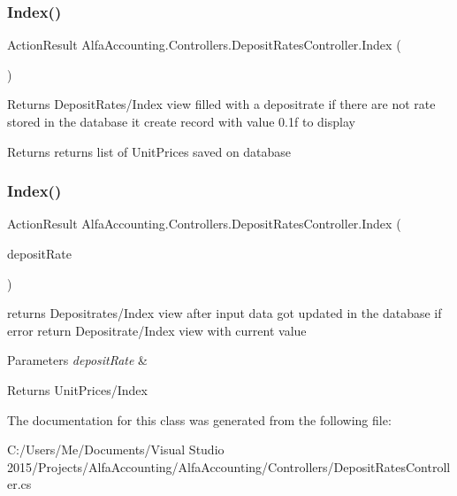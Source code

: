 \subsubsection{\texorpdfstring{Index()}{Index()}\hspace{0.1cm}{\footnotesize\ttfamily [1/2]}}
{\footnotesize\ttfamily Action\+Result Alfa\+Accounting.\+Controllers.\+Deposit\+Rates\+Controller.\+Index (\begin{DoxyParamCaption}{ }\end{DoxyParamCaption})}



Returns Deposit\+Rates/\+Index view filled with a depositrate if there are not rate stored in the database it create record with value 0.\+1f to display 

\begin{DoxyReturn}{Returns}
returns list of Unit\+Prices saved on database 
\end{DoxyReturn}
\mbox{\label{class_alfa_accounting_1_1_controllers_1_1_deposit_rates_controller_a3aa92fede4c4258ab97202ac2788b0d9}} 
\subsubsection{\texorpdfstring{Index()}{Index()}\hspace{0.1cm}{\footnotesize\ttfamily [2/2]}}
{\footnotesize\ttfamily Action\+Result Alfa\+Accounting.\+Controllers.\+Deposit\+Rates\+Controller.\+Index (\begin{DoxyParamCaption}\item[{\mbox{[}\+Bind(\+Include = \char`\"{}\+Deposit\+Rate\+Id,\+Deposit\+Rate\+Value\char`\"{})\mbox{]} Deposit\+Rate}]{deposit\+Rate }\end{DoxyParamCaption})}



returns Depositrates/\+Index view after input data got updated in the database if error return Depositrate/\+Index view with current value 


\begin{DoxyParams}{Parameters}
{\em deposit\+Rate} & \\
\hline
\end{DoxyParams}
\begin{DoxyReturn}{Returns}
Unit\+Prices/\+Index 
\end{DoxyReturn}


The documentation for this class was generated from the following file\+:\begin{DoxyCompactItemize}
\item 
C\+:/\+Users/\+Me/\+Documents/\+Visual Studio 2015/\+Projects/\+Alfa\+Accounting/\+Alfa\+Accounting/\+Controllers/Deposit\+Rates\+Controller.\+cs\end{DoxyCompactItemize}
